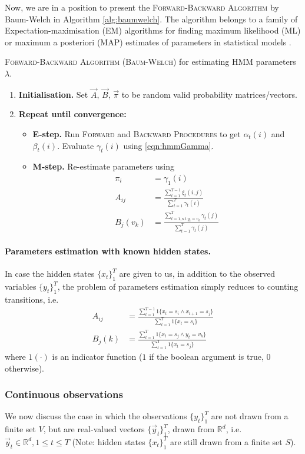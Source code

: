 Now, we are in a position to present the \textsc{Forward-Backward Algorithm} by Baum-Welch in Algorithm \ref{alg:baumwelch}. The algorithm belongs to a family of Expectation-maximisation (EM) algorithms for finding maximum likelihood (ML) or maximum a posteriori (MAP) estimates of parameters in statistical models \cite{wiki:EM}.
\begin{algorithm}
	\caption{\textsc{Forward-Backward Algorithm (Baum-Welch)} for estimating HMM parameters $\lambda$.}
	\label{alg:baumwelch}
	\begin{enumerate}
		\item
			\textbf{Initialisation.}
			Set $\vec A$, $\vec B$, $\vec \pi$ to be random valid probability matrices/vectors.
		\item
			\textbf{Repeat until convergence:}
			\begin{itemize}
				\item \textbf{E-step.} Run \textsc{Forward} and \textsc{Backward Procedures} to get $\alpha_t(i)$ and $\beta_t(i)$. Evaluate $\gamma_t(i)$ using \eqref{eqn:hmmGamma}.
				\item \textbf{M-step.} Re-estimate parameters using
				\begin{align*}
					\pi_i & = \gamma_1(i) \\
					A_{ij} & = \frac{\sum_{t = 1}^{T - 1} \xi_t(i, j)}{\sum_{t = 1}^T \gamma_t(i)} \\
					B_j(v_k) & = \frac{\sum_{t = 1, \text{s.t.} y_t = v_k}^T \gamma_t(j)}{\sum_{t = 1}^T \gamma_t(j)}
				\end{align*}
			\end{itemize}
	\end{enumerate}
\end{algorithm}

\paragraph{Parameters estimation with known hidden states.} In case the hidden states $\{x_t\}_1^T$ are given to us, in addition to the observed variables $\{y_t\}_1^T$, the problem of parameters estimation simply reduces to counting transitions, i.e.
	\begin{align}
		A_{ij} & = \frac{\sum_{t = 1}^{T - 1} 1\{x_t = s_i \land x_{t + 1} = s_j\}}{\sum_{t = 1}^{T} 1\{x_t = s_i\}} \\
		B_j(k) & = \frac{\sum_{t = 1}^T 1\{x_t = s_j \land y_t = v_k\}}{\sum_{t = 1}^{T} 1\{x_t = s_j\}}
	\end{align}
where $1(\cdot)$ is an indicator function ($1$ if the boolean argument is true, $0$ otherwise).

\subsubsection{Continuous observations}
	We now discuss the case in which the observations $\{y_t\}_1^T$ are not drawn from a finite set $V$, but are real-valued vectors $\{\vec y_t\}_1^T$, drawn from $\mathbb{R}^d$, i.e. $\vec y_t \in \mathbb{R}^d, 1 \leq t \leq T$ (Note: hidden states $\{x_t\}_1^T$ are still drawn from a finite set $S$).